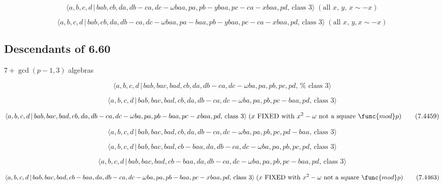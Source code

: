 \documentclass[10pt]{article}
\begin{document}
\begin{equation}
\langle a,b,c,d\,|\,bab,cb,da,db-ca,dc-\omega baa,pa,pb-ybaa,pc-ca-xbaa,pd,\,%
\text{class }3\rangle \;(\text{all }x,\,y,\,x\sim -x)  \tag{7.4455}
\end{equation}

\begin{equation}
\langle a,b,c,d\,|\,bab,cb,da,db-ca,dc-\omega
baa,pa-baa,pb-ybaa,pc-ca-xbaa,pd,\,\text{class }3\rangle \;(\text{all }%
x,\,y,x\sim -x)  \tag{7.4456}
\end{equation}

\subsection{Descendants of 6.60}

$7+\gcd (p-1,3)$ algebras

\begin{equation}
\langle a,b,c,d\,|\,bab,bac,bad,cb,da,db-ca,dc-\omega ba,pa,pb,pc,pd,\,\text{%
class }3\rangle  \tag{7.4457}
\end{equation}

\begin{equation}
\langle a,b,c,d\,|\,bab,bac,bad,cb,da,db-ca,dc-\omega ba,pa,pb,pc-baa,pd,\,%
\text{class }3\rangle  \tag{7.4458}
\end{equation}

\begin{equation}
\langle a,b,c,d\,|\,bab,bac,bad,cb,da,db-ca,dc-\omega
ba,pa,pb-baa,pc-xbaa,pd,\,\text{class }3\rangle \;(x\text{ FIXED with }%
x^{2}-\omega \text{ not a square }\func{mod}p)  \tag{7.4459}
\end{equation}

\begin{equation}
\langle a,b,c,d\,|\,bab,bac,bad,cb,da,db-ca,dc-\omega ba,pa,pb,pc,pd-baa,\,%
\text{class }3\rangle  \tag{7.4460}
\end{equation}

\begin{equation}
\langle a,b,c,d\,|\,bab,bac,bad,cb-baa,da,db-ca,dc-\omega ba,pa,pb,pc,pd,\,%
\text{class }3\rangle  \tag{7.4461}
\end{equation}

\begin{equation}
\langle a,b,c,d\,|\,bab,bac,bad,cb-baa,da,db-ca,dc-\omega
ba,pa,pb,pc-baa,pd,\,\text{class }3\rangle  \tag{7.4462}
\end{equation}

\begin{equation}
\langle a,b,c,d\,|\,bab,bac,bad,cb-baa,da,db-ca,dc-\omega
ba,pa,pb-baa,pc-xbaa,pd,\,\text{class }3\rangle \;(x\text{ FIXED with }%
x^{2}-\omega \text{ not a square }\func{mod}p)  \tag{7.4463}
\end{equation}
\end{document}
